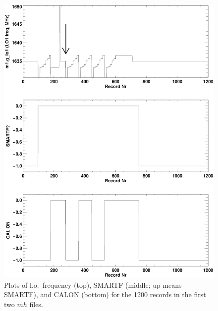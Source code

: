 \documentclass[psfig,preprint]{aastex}
\begin{document}
{\begin{figure}[!p]
\begin{center}
\includegraphics[width=6in]{kevintst0.ps}
\end{center}
\caption{Plots of l.o.\ frequency (top), SMARTF (middle; up means
SMARTF), and CALON (bottom) for the 1200 records in the first two
$mh$ files. \label{kevintst0}}
\end{figure}

}
\end{document}
